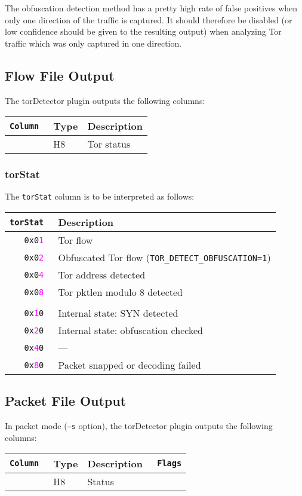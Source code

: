 \documentclass[documentation]{subfiles}
\begin{document}
The obfuscation detection method has a pretty high rate of false positives when only one direction
of the traffic is captured. It should therefore be disabled (or low confidence should be given to
the resulting output) when analyzing Tor traffic which was only captured in one direction.

\subsection{Flow File Output}
The torDetector plugin outputs the following columns:
\begin{longtable}{>{\tt}lll}%
    \toprule
    {\bf Column} & {\bf Type} & {\bf Description}\\%
    \midrule\endhead%
    \nameref{torStat} & H8 & Tor status\\
    \bottomrule
\end{longtable}

\subsubsection{torStat}\label{torStat}
The {\tt torStat} column is to be interpreted as follows:
\begin{longtable}{>{\tt}rl}
    \toprule
    {\bf torStat} & {\bf Description}\\
    \midrule\endhead%
    0x0\textcolor{magenta}{1} & Tor flow\\
    0x0\textcolor{magenta}{2} & Obfuscated Tor flow ({\tt TOR\_DETECT\_OBFUSCATION=1})\\
    0x0\textcolor{magenta}{4} & Tor address detected\\
    0x0\textcolor{magenta}{8} & Tor pktlen modulo 8 detected\\
    \\
    0x\textcolor{magenta}{1}0 & Internal state: SYN detected\\
    0x\textcolor{magenta}{2}0 & Internal state: obfuscation checked\\
    0x\textcolor{magenta}{4}0 & ---\\
    0x\textcolor{magenta}{8}0 & Packet snapped or decoding failed\\
    \bottomrule
\end{longtable}

\subsection{Packet File Output}
In packet mode ({\tt --s} option), the torDetector plugin outputs the following columns:
\begin{longtable}{>{\tt}lll>{\tt\small}l}
    \toprule
    {\bf Column} & {\bf Type} & {\bf Description} & {\bf Flags}\\
    \midrule\endhead%
    \nameref{torStat} & H8 & Status & \\
    \bottomrule
\end{longtable}
\end{document}
